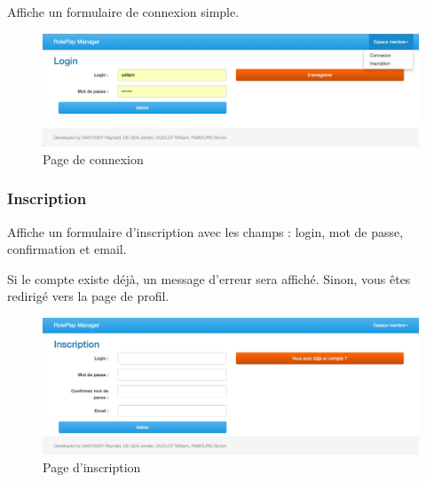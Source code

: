 \documentclass[a4paper,oneside,10pt]{article}
\begin{document}
Affiche un formulaire de connexion simple. 
\begin{figure}[H]
	\begin{center}
		\includegraphics[width=\textwidth]{images/manuel/login.png}  
		\caption{Page de connexion}
	\end{center}
\end{figure}


\subsubsection{Inscription}
\label{MUInscription}

Affiche un formulaire d'inscription avec les champs : login, mot de passe, confirmation et email. 

Si le compte existe déjà, un message d'erreur sera affiché. Sinon, vous êtes redirigé vers la page de profil. 
\begin{figure}[H]
	\begin{center}
		\includegraphics[width=\textwidth]{images/manuel/register.png}  
		\caption{Page d'inscription}
	\end{center}
\end{figure}
\end{document}
